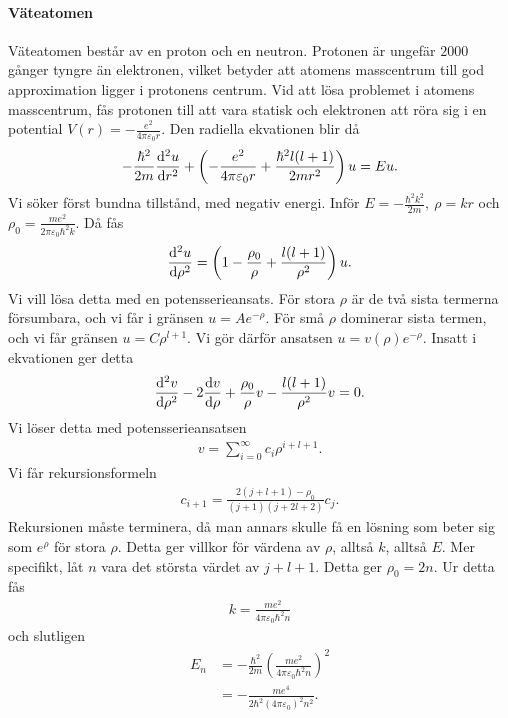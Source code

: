 \paragraph{Väteatomen}
Väteatomen består av en proton och en neutron. Protonen är ungefär $2000$ gånger tyngre än elektronen, vilket betyder att atomens masscentrum till god approximation ligger i protonens centrum. Vid att lösa problemet i atomens masscentrum, fås protonen till att vara statisk och elektronen att röra sig i en potential $V(r) = -\frac{e^{2}}{4\pi\varepsilon_{0}r}$. Den radiella ekvationen blir då
\begin{align*}
	-\frac{\hbar^{2}}{2m}\dv[2]{u}{r} + \left(-\frac{e^{2}}{4\pi\varepsilon_{0}r} + \frac{\hbar^{2}l(l + 1)}{2mr^{2}}\right)u = Eu.
\end{align*}
Vi söker först bundna tillstånd, med negativ energi. Inför $E = -\frac{\hbar^{2}k^{2}}{2m},\ \rho = kr$ och $\rho_{0} = \frac{me^{2}}{2\pi\varepsilon_{0}\hbar^{2}k}$. Då fås
\begin{align*}
	\dv[2]{u}{\rho} = \left(1 - \frac{\rho_{0}}{\rho} + \frac{l(l + 1)}{\rho^{2}}\right)u.
\end{align*}
Vi vill lösa detta med en potensserieansats. För stora $\rho$ är de två sista termerna försumbara, och vi får i gränsen $u = Ae^{-\rho}$. För små $\rho$ dominerar sista termen, och vi får gränsen $u = C\rho^{l + 1}$. Vi gör därför ansatsen $u = v(\rho)e^{-\rho}$. Insatt i ekvationen ger detta
\begin{align*}
	\dv[2]{v}{\rho} - 2\dv{v}{\rho} + \frac{\rho_{0}}{\rho}v - \frac{l(l + 1)}{\rho^{2}}v = 0.
\end{align*}
Vi löser detta med potensserieansatsen
\begin{align*}
	v = \sum\limits_{i = 0}^{\infty}c_{i}\rho^{i + l + 1}.
\end{align*}
Vi får rekursionsformeln
\begin{align*}
	c_{i + 1} = \frac{2(j + l + 1) - \rho_{0}}{(j + 1)(j + 2l + 2)}c_{j}.
\end{align*}
Rekursionen måste terminera, då man annars skulle få en lösning som beter sig som $e^{\rho}$ för stora $\rho$. Detta ger villkor för värdena av $\rho$, alltså $k$, alltså $E$. Mer specifikt, låt $n$ vara det största värdet av $j + l + 1$. Detta ger $\rho_{0} = 2n$. Ur detta fås
\begin{align*}
	k = \frac{me^{2}}{4\pi\varepsilon_{0}\hbar^{2}n}
\end{align*}
och slutligen
\begin{align*}
	E_{n} &= -\frac{\hbar^{2}}{2m}\left(\frac{me^{2}}{4\pi\varepsilon_{0}\hbar^{2}n}\right)^{2} \\
	      &= -\frac{me^{4}}{2\hbar^{2}(4\pi\varepsilon_{0})^{2}n^{2}}.
\end{align*}
